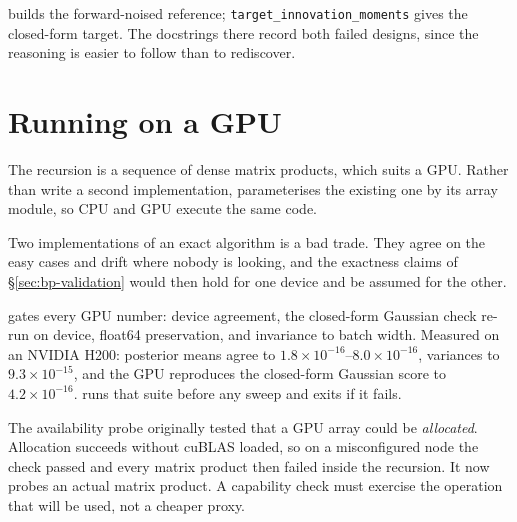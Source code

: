 \begin{codebox}
 builds the forward-noised
reference; \texttt{target\_innovation\_moments} gives the closed-form target. The docstrings
there record both failed designs, since the reasoning is easier to follow than to rediscover.
\end{codebox}

\section{Running on a GPU}

The recursion is a sequence of dense matrix products, which suits a GPU. Rather than write a
second implementation,  parameterises the existing one by its array
module, so CPU and GPU execute the same code.

\begin{intuition}
Two implementations of an exact algorithm is a bad trade. They agree on the easy cases and
drift where nobody is looking, and the exactness claims of \S\ref{sec:bp-validation} would then
hold for one device and be assumed for the other.
\end{intuition}

\begin{codebox}
 gates every GPU number: device agreement, the
closed-form Gaussian check re-run on device, float64 preservation, and invariance to batch
width. Measured on an NVIDIA H200: posterior means agree to $1.8\times10^{-16}$--$8.0\times10^{-16}$,
variances to $9.3\times10^{-15}$, and the GPU reproduces the closed-form Gaussian score to
$4.2\times10^{-16}$.  runs that suite before any sweep and
exits if it fails.
\end{codebox}

\begin{pitfall}
The availability probe originally tested that a GPU array could be \emph{allocated}. Allocation
succeeds without cuBLAS loaded, so on a misconfigured node the check passed and every matrix
product then failed inside the recursion. It now probes an actual matrix product. A capability
check must exercise the operation that will be used, not a cheaper proxy.
\end{pitfall}
